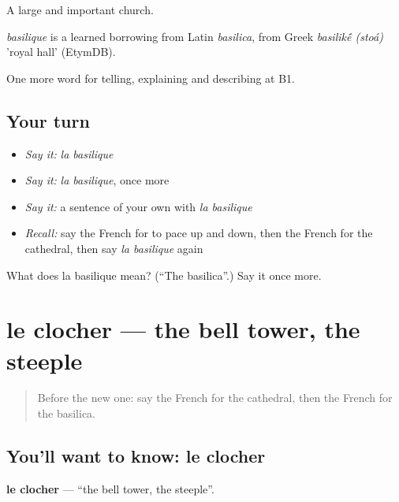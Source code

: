 A large and important church.

\begin{cousinweb}
\emph{basilique} is a learned borrowing from Latin \emph{basilica}, from Greek \emph{basilik\'{\={e}} (stoá)} 'royal hall' (EtymDB).
\end{cousinweb}

\begin{grammarlens}[title={What you've built}]
One more word for telling, explaining and describing at B1.
\end{grammarlens}

\subsection*{Your turn}
\begin{itemize}
\raggedright
  \item \emph{Say it:} \emph{la basilique}
  \item \emph{Say it:} \emph{la basilique}, once more
  \item \emph{Say it:} a sentence of your own with \emph{la basilique}
  \item \emph{Recall:} say the French for to pace up and down, then the French for the cathedral, then say \emph{la basilique} again
\end{itemize}

\begin{tcolorbox}[breakable,colback=teal!4,colframe=teal!35!black,title={Before you move on}]
What does la basilique mean? (\textquotedblleft{}The basilica\textquotedblright{}.) Say it once more.
\end{tcolorbox}
\section[le clocher]{le clocher — the bell tower, the steeple}

\label{lesson:FR-C439-clocher}



\begin{quote}
Before the new one: say the French for the cathedral, then the French for the basilica.
\end{quote}

\subsection*{You'll want to know: le clocher}
\textbf{le clocher} — \textquotedblleft{}the bell tower, the steeple\textquotedblright{}.

